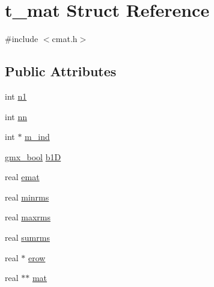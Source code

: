 \hypertarget{structt__mat}{\section{t\-\_\-mat \-Struct \-Reference}
\label{structt__mat}
}


{\ttfamily \#include $<$cmat.\-h$>$}

\subsection*{\-Public \-Attributes}
\begin{DoxyCompactItemize}
\item 
int \hyperlink{structt__mat_aa2137cd71b7befd7169853f448a1d21e}{n1}
\item 
int \hyperlink{structt__mat_a5109af62855a77c226913e0bc069fb69}{nn}
\item 
int $\ast$ \hyperlink{structt__mat_a57e34c5d249b5ac5151898196eb89ddc}{m\-\_\-ind}
\item 
\hyperlink{include_2types_2simple_8h_a8fddad319f226e856400d190198d5151}{gmx\-\_\-bool} \hyperlink{structt__mat_ac931cade445db52de3c635ad6dad3527}{b1\-D}
\item 
real \hyperlink{structt__mat_a17987a9b399f03d86e70266977803fa3}{emat}
\item 
real \hyperlink{structt__mat_a508915b9f705577e9b0073b65570b7af}{minrms}
\item 
real \hyperlink{structt__mat_aa1c488540c1687ca49953d76abee1b9e}{maxrms}
\item 
real \hyperlink{structt__mat_ad2f6e17820e1417a2426d79ccefa7733}{sumrms}
\item 
real $\ast$ \hyperlink{structt__mat_a33f5d05e52771b10923a3c7c81a45f13}{erow}
\item 
real $\ast$$\ast$ \hyperlink{structt__mat_a073cd1d6040413069387ff67ddab647e}{mat}
\end{DoxyCompactItemize}


